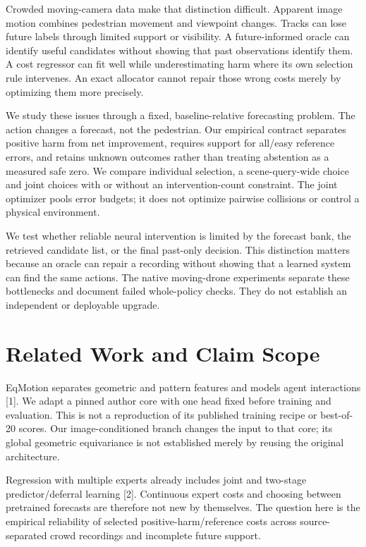 \documentclass[10pt,twocolumn,letterpaper]{article}
\begin{document}
Crowded moving-camera data make that distinction difficult. Apparent image motion combines pedestrian movement and viewpoint changes. Tracks can lose future labels through limited support or visibility. A future-informed oracle can identify useful candidates without showing that past observations identify them. A cost regressor can fit well while underestimating harm where its own selection rule intervenes. An exact allocator cannot repair those wrong costs merely by optimizing them more precisely.


We study these issues through a fixed, baseline-relative forecasting problem. The action changes a forecast, not the pedestrian. Our empirical contract separates positive harm from net improvement, requires support for all/easy reference errors, and retains unknown outcomes rather than treating abstention as a measured safe zero. We compare individual selection, a scene-query-wide choice and joint choices with or without an intervention-count constraint. The joint optimizer pools error budgets; it does not optimize pairwise collisions or control a physical environment.


We test whether reliable neural intervention is limited by the forecast bank, the retrieved candidate list, or the final past-only decision. This distinction matters because an oracle can repair a recording without showing that a learned system can find the same actions. The native moving-drone experiments separate these bottlenecks and document failed whole-policy checks. They do not establish an independent or deployable upgrade.


\section{Related Work and Claim Scope}

EqMotion separates geometric and pattern features and models agent interactions [1]. We adapt a pinned author core with one head fixed before training and evaluation. This is not a reproduction of its published training recipe or best-of-20 scores. Our image-conditioned branch changes the input to that core; its global geometric equivariance is not established merely by reusing the original architecture.


Regression with multiple experts already includes joint and two-stage predictor/deferral learning [2]. Continuous expert costs and choosing between pretrained forecasts are therefore not new by themselves. The question here is the empirical reliability of selected positive-harm/reference costs across source-separated crowd recordings and incomplete future support.
\end{document}
